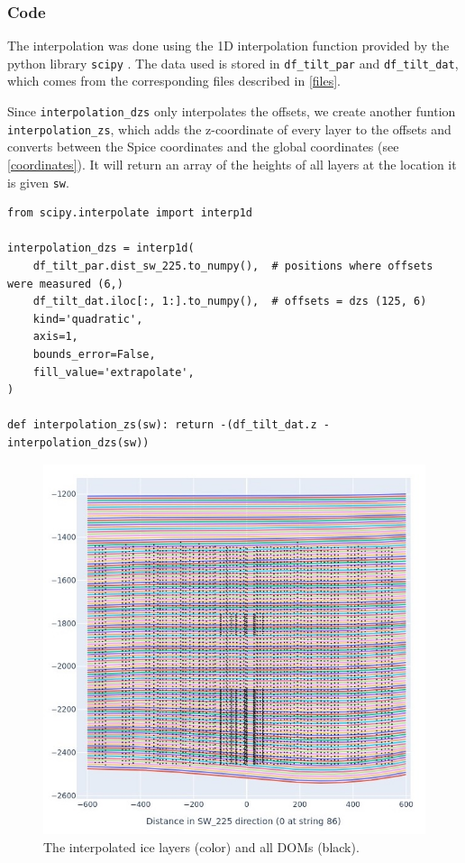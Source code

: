 \documentclass[a4paper,10pt]{scrartcl}
\begin{document}
\subsubsection*{Code}

The interpolation was done using the 1D interpolation function provided by the python library \texttt{scipy} \cite{scipy}.
The data used is stored in \texttt{df\_tilt\_par} and \texttt{df\_tilt\_dat}, which comes from the corresponding files described in \ref{files}.

Since \texttt{interpolation\_dzs} only interpolates the offsets, we create another funtion \texttt{interpolation\_zs}, which adds the z-coordinate of every layer to the offsets and converts between the Spice coordinates and the global coordinates (see \ref{coordinates}).
It will return an array of the heights of all layers at the location it is given \texttt{sw}.

\begin{verbatim}
from scipy.interpolate import interp1d

interpolation_dzs = interp1d(
    df_tilt_par.dist_sw_225.to_numpy(),  # positions where offsets were measured (6,)
    df_tilt_dat.iloc[:, 1:].to_numpy(),  # offsets = dzs (125, 6)
    kind='quadratic',
    axis=1,
    bounds_error=False,
    fill_value='extrapolate',
)

def interpolation_zs(sw): return -(df_tilt_dat.z - interpolation_dzs(sw))
\end{verbatim}

\begin{figure}[H]
    \includegraphics[scale=0.6]{images/layers_2d.jpg}
    \centering
    \caption{The interpolated ice layers (color) and all DOMs (black).}
    \label{fig:layers_2d}
\end{figure}
\end{document}
